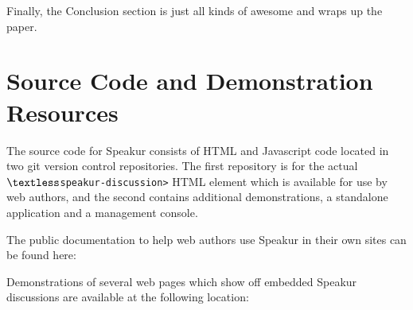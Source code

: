 Finally, the Conclusion section is just all kinds of awesome and wraps up the paper. 

\section{Source Code and Demonstration Resources}
%

The source code for Speakur consists of HTML and Javascript code located in two git version control repositories. The first repository is for the actual \texttt{$\textless$speakur-discussion\textgreater} HTML element which is available for use by web authors, and the second contains additional demonstrations, a standalone application and a management console.

The public documentation to help web authors use Speakur in their own sites can be found here:

Demonstrations of several web pages which show off embedded Speakur discussions are available at the following location:

